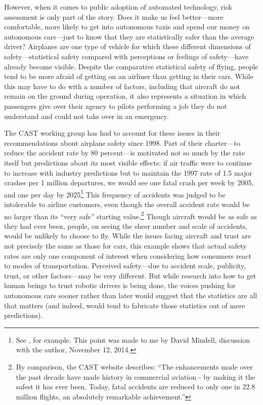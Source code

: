 
However, when it comes to public adoption of automated technology,
risk assessment is only part of the story. Does it make us feel better---more
comfortable, more likely to get into autonomous taxis and spend our
money on autonomous cars---just to know that they are statistically safer
than the average driver? Airplanes are one type of vehicle for which
these different dimensions of 
safety---statistical safety compared with perceptions or feelings of
safety---have already become visible. Despite the comparative statistical safety of flying,
people tend to be more afraid of getting on an airliner than getting in their
cars.\cite{???} While this may have to do with a number of factors,
including that aircraft do not remain on the ground during operation,
it also represents a situation in which passengers give over their
agency to pilots performing a job they do not understand and could not
take over in an emergency.\cite{???-canIFindAnythingOnThis}


The CAST working group has had to account for these issues in their
recommendations about airplane safety since 1998. Part of their charter---to
reduce the accident rate by 80 percent\cite{???-PARCCAST}---is
motivated not so much by the rate itself but predictions about its
most visible effects:  if air traffic were to continue to increase
with industry predictions but to maintain the 1997 rate of 1.5 major
crashes per 1 million departures, we would see one fatal crash per
week by 2005, and one per day by 2025\footnote{See
  \cite{http://articles.orlandosentinel.com/1999-11-07/news/9911070029_1_plane-aviation-safety-type-of-accident},
  for example. This point was made to me by David Mindell, discussion
  with the author, November 12, 2014.}
This frequency of accidents was judged to be intolerable to
airline customers, even though the overall accident rate would be no
larger than its ``very safe''\cite{???-PARCCAST} starting
value.\footnote{By comparison, the CAST website describes: ``The
  enhancements made over the past decade have made history in
  commercial aviation - by making it the safest it has ever been.
  Today, fatal accidents are reduced to only one in 22.8 million
  flights, an absolutely remarkable achievement.''\cite{???-cast-safety.org}} Though
aircraft would be as safe as they 
had ever been, people, on seeing the sheer number and scale of
accidents, would be unlikely to choose to fly. While the issues facing
aircraft and trust are not precisely the same as those for cars, this
example shows that actual safety rates are only
one component of interest when considering how consumers react to
modes of transportation. Perceived safety---due to accident scale,
publicity, trust, or other factors---may be very different. But
while research into how to get human beings to trust robotic drivers
is being done\cite{???}, the voices pushing for autonomous cars sooner
rather than later would suggest that the statistics are all that
matters (and indeed, would tend to fabricate those statistics out of
mere predictions). 


